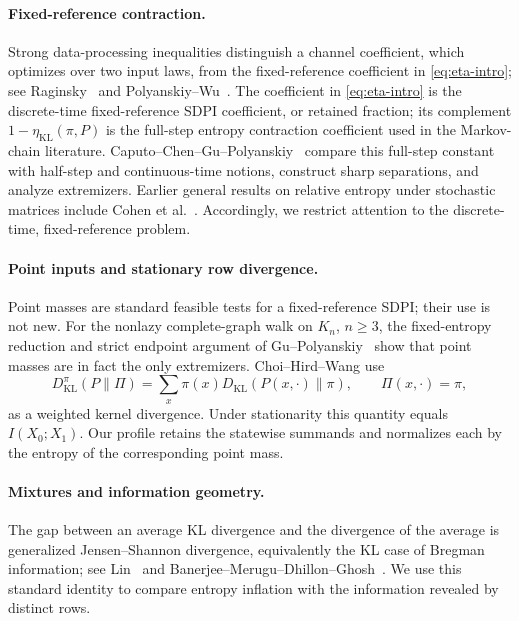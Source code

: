 \documentclass[11pt]{article}
\newcommand{\KL}{D_{\mathrm{KL}}}
\newcommand{\etaStat}{\eta_{\mathrm{KL}}(\pi,P)}
\begin{document}
\paragraph{Fixed-reference contraction.}
Strong data-processing inequalities distinguish a channel coefficient,
which optimizes over two input laws, from the fixed-reference coefficient
in \eqref{eq:eta-intro}; see Raginsky~\cite{Raginsky2016} and
Polyanskiy--Wu~\cite{PolyanskiyWu2017}.  The coefficient in
\eqref{eq:eta-intro} is the discrete-time
fixed-reference SDPI coefficient, or retained fraction; its complement
\(1-\etaStat\) is the full-step entropy contraction coefficient used in the
Markov-chain literature.  Caputo--Chen--Gu--Polyanskiy~\cite{CaputoEtAl2025} compare this full-step constant
with half-step and continuous-time notions, construct sharp separations,
and analyze extremizers.  Earlier general results on relative entropy under
stochastic matrices include Cohen et al.~\cite{CohenEtAl1993}.  Accordingly,
we restrict attention to the discrete-time, fixed-reference problem.

\paragraph{Point inputs and stationary row divergence.}
Point masses are standard feasible tests for a fixed-reference SDPI; their
use is not new.  For the nonlazy complete-graph walk on \(K_n\), \(n\ge3\),
the fixed-entropy reduction and strict endpoint argument of
Gu--Polyanskiy~\cite[Proposition~18 and Section~5.2]{GuPolyanskiy2023}
show that point masses are in fact the only extremizers.  Choi--Hird--Wang
\cite{ChoiHirdWang2025} use
\[
  D_{\mathrm{KL}}^\pi(P\|\Pi)
  =\sum_x\pi(x)\KL(P(x,\cdot)\|\pi),
  \qquad \Pi(x,\cdot)=\pi,
\]
as a weighted kernel divergence.  Under stationarity this quantity equals
\(I(X_0;X_1)\).  Our profile retains the statewise summands and normalizes
each by the entropy of the corresponding point mass.

\paragraph{Mixtures and information geometry.}
The gap between an average KL divergence and the divergence of the average
is generalized Jensen--Shannon divergence, equivalently the KL case of
Bregman information; see Lin~\cite{Lin1991} and
Banerjee--Merugu--Dhillon--Ghosh~\cite{BanerjeeEtAl2005}.  We use this
standard identity to compare entropy inflation with the information
revealed by distinct rows.
\end{document}
